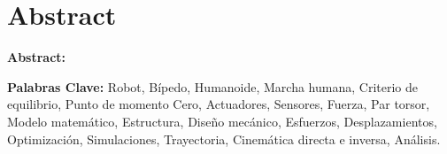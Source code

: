 \chapter{Abstract}

\textbf{Abstract:}




\textbf{Palabras Clave:} Robot, Bípedo, Humanoide,  Marcha humana, Criterio de equilibrio, Punto de momento Cero, Actuadores, Sensores, Fuerza, Par torsor, Modelo matemático, Estructura, Diseño mecánico, Esfuerzos, Desplazamientos, Optimización, Simulaciones, Trayectoria, Cinemática directa e inversa, Análisis. \\


\endinput 
